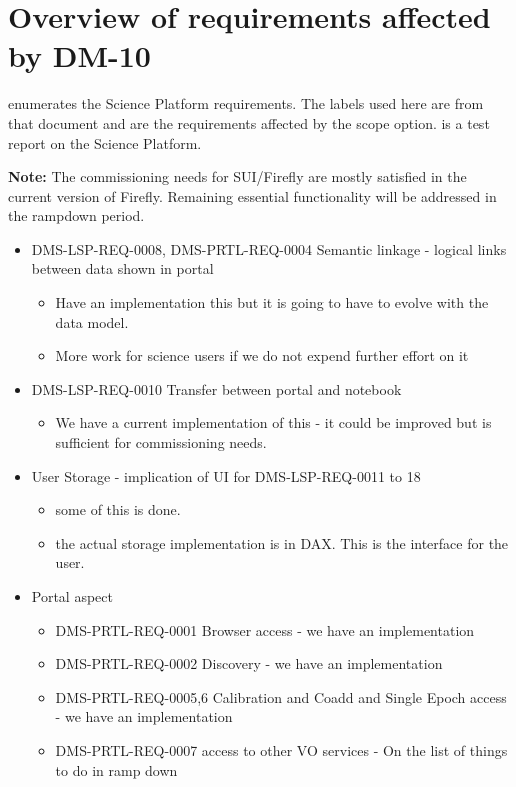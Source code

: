 \section { Overview of requirements affected by DM-10}\label{sect:reqs}
 enumerates the Science Platform requirements.
The labels used here are from that document and are the requirements affected by the scope option.
 is a test report on the Science Platform.

\textbf{Note:} The commissioning needs for SUI/Firefly are mostly satisfied in the current version of Firefly. Remaining essential functionality will be addressed in the rampdown period. 
\begin{itemize}
\item DMS-LSP-REQ-0008, DMS-PRTL-REQ-0004 Semantic linkage - logical links between data shown in portal
\begin{itemize}
\item Have an implementation this but it is going to have to evolve with the data model.
\item More work for science users if we do not expend further effort on it
\end{itemize}

\item DMS-LSP-REQ-0010 Transfer between portal and notebook
\begin{itemize}
\item We have a current implementation of this - it could be improved but is sufficient for commissioning needs.
\end{itemize}
\item User Storage - implication of UI for DMS-LSP-REQ-0011 to 18
\begin{itemize}
\item some of this is done.
\item the actual storage implementation is in DAX. This is the interface for the user.
\end{itemize}
\item Portal aspect
\begin{itemize}
\item DMS-PRTL-REQ-0001 Browser access  - we have an implementation
\item DMS-PRTL-REQ-0002 Discovery  - we have an implementation
\item DMS-PRTL-REQ-0005,6 Calibration and Coadd and Single Epoch access  - we have an implementation
\item DMS-PRTL-REQ-0007 access to other VO services - On the list of things to do in ramp down
\end{itemize}


\end{itemize}
